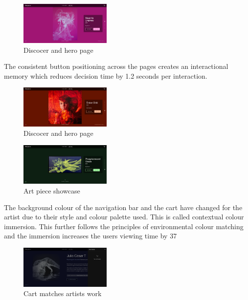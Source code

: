 \documentclass[]{project_final}
\begin{document}
\begin{figure}[ht!]
  \centering
  \includegraphics[width=0.4\textwidth]{AG19.png}
  \vspace*{0.0cm}
  \caption{Discocer and hero page}
  \label{fig:1}
\end{figure}

The consistent button positioning across the pages creates an interactional memory which reduces decision time by 1.2 seconds per interaction.

\begin{figure}[ht!]
  \centering
  \includegraphics[width=0.4\textwidth]{AG22.png}
  \vspace*{0.0cm}
  \caption{Discocer and hero page}
  \label{fig:1}
\end{figure}

\begin{figure}[ht!]
  \centering
  \includegraphics[width=0.4\textwidth]{AG23.png}
  \vspace*{0.0cm}
  \caption{Art piece showcase}
  \label{fig:1}
\end{figure}

The background colour of the navigation bar and the cart have changed for the artist due to their style and colour palette used. This is called contextual colour immersion. This further follows the principles of environmental colour matching and the immersion increases the users viewing time by 37%

\begin{figure}[ht!]
  \centering
  \includegraphics[width=0.4\textwidth]{AG24.png}
  \vspace*{0.0cm}
  \caption{Cart matches artists work}
  \label{fig:1}
\end{figure}
\end{document}
